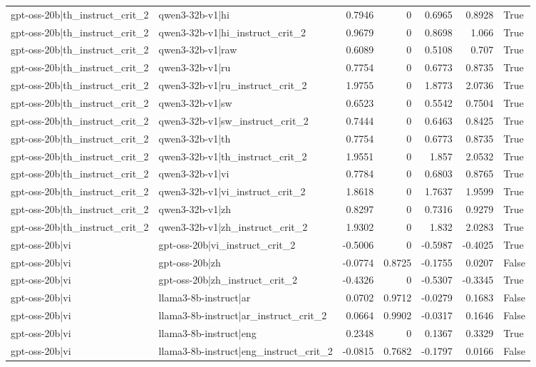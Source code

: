 \begin{table}
\begin{tabular}{l l r r r r l}
gpt-oss-20b|th_instruct_crit_2 & qwen3-32b-v1|hi & 0.7946 & 0 & 0.6965 & 0.8928 & True \\
gpt-oss-20b|th_instruct_crit_2 & qwen3-32b-v1|hi_instruct_crit_2 & 0.9679 & 0 & 0.8698 & 1.066 & True \\
gpt-oss-20b|th_instruct_crit_2 & qwen3-32b-v1|raw & 0.6089 & 0 & 0.5108 & 0.707 & True \\
gpt-oss-20b|th_instruct_crit_2 & qwen3-32b-v1|ru & 0.7754 & 0 & 0.6773 & 0.8735 & True \\
gpt-oss-20b|th_instruct_crit_2 & qwen3-32b-v1|ru_instruct_crit_2 & 1.9755 & 0 & 1.8773 & 2.0736 & True \\
gpt-oss-20b|th_instruct_crit_2 & qwen3-32b-v1|sw & 0.6523 & 0 & 0.5542 & 0.7504 & True \\
gpt-oss-20b|th_instruct_crit_2 & qwen3-32b-v1|sw_instruct_crit_2 & 0.7444 & 0 & 0.6463 & 0.8425 & True \\
gpt-oss-20b|th_instruct_crit_2 & qwen3-32b-v1|th & 0.7754 & 0 & 0.6773 & 0.8735 & True \\
gpt-oss-20b|th_instruct_crit_2 & qwen3-32b-v1|th_instruct_crit_2 & 1.9551 & 0 & 1.857 & 2.0532 & True \\
gpt-oss-20b|th_instruct_crit_2 & qwen3-32b-v1|vi & 0.7784 & 0 & 0.6803 & 0.8765 & True \\
gpt-oss-20b|th_instruct_crit_2 & qwen3-32b-v1|vi_instruct_crit_2 & 1.8618 & 0 & 1.7637 & 1.9599 & True \\
gpt-oss-20b|th_instruct_crit_2 & qwen3-32b-v1|zh & 0.8297 & 0 & 0.7316 & 0.9279 & True \\
gpt-oss-20b|th_instruct_crit_2 & qwen3-32b-v1|zh_instruct_crit_2 & 1.9302 & 0 & 1.832 & 2.0283 & True \\
gpt-oss-20b|vi & gpt-oss-20b|vi_instruct_crit_2 & -0.5006 & 0 & -0.5987 & -0.4025 & True \\
gpt-oss-20b|vi & gpt-oss-20b|zh & -0.0774 & 0.8725 & -0.1755 & 0.0207 & False \\
gpt-oss-20b|vi & gpt-oss-20b|zh_instruct_crit_2 & -0.4326 & 0 & -0.5307 & -0.3345 & True \\
gpt-oss-20b|vi & llama3-8b-instruct|ar & 0.0702 & 0.9712 & -0.0279 & 0.1683 & False \\
gpt-oss-20b|vi & llama3-8b-instruct|ar_instruct_crit_2 & 0.0664 & 0.9902 & -0.0317 & 0.1646 & False \\
gpt-oss-20b|vi & llama3-8b-instruct|eng & 0.2348 & 0 & 0.1367 & 0.3329 & True \\
gpt-oss-20b|vi & llama3-8b-instruct|eng_instruct_crit_2 & -0.0815 & 0.7682 & -0.1797 & 0.0166 & False \\

\end{tabular}
\end{table}
